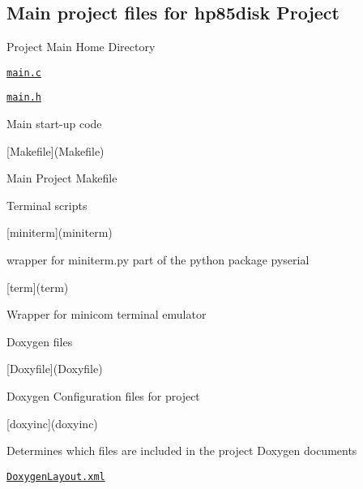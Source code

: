 \subsection*{Main project files for hp85disk Project}


\begin{DoxyItemize}
\item Project Main Home Directory
\begin{DoxyItemize}
\item \href{main.c}{\tt main.\+c}
\item \href{main.h}{\tt main.\+h}
\begin{DoxyItemize}
\item Main start-\/up code
\end{DoxyItemize}
\item \mbox{[}Makefile\mbox{]}(Makefile)
\begin{DoxyItemize}
\item Main Project Makefile
\end{DoxyItemize}
\end{DoxyItemize}
\item Terminal scripts
\begin{DoxyItemize}
\item \mbox{[}miniterm\mbox{]}(miniterm)
\begin{DoxyItemize}
\item wrapper for miniterm.\+py part of the python package pyserial
\end{DoxyItemize}
\item \mbox{[}term\mbox{]}(term)
\begin{DoxyItemize}
\item Wrapper for minicom terminal emulator
\end{DoxyItemize}
\end{DoxyItemize}
\item Doxygen files
\begin{DoxyItemize}
\item \mbox{[}Doxyfile\mbox{]}(Doxyfile)
\begin{DoxyItemize}
\item Doxygen Configuration files for project
\end{DoxyItemize}
\item \mbox{[}doxyinc\mbox{]}(doxyinc)
\begin{DoxyItemize}
\item Determines which files are included in the project Doxygen documents
\end{DoxyItemize}
\item \href{DoxygenLayout.xml}{\tt Doxygen\+Layout.\+xml}

\end{DoxyItemize}
\end{DoxyItemize}
